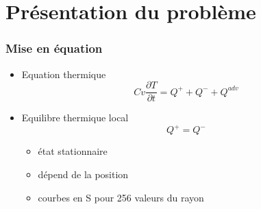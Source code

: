 \documentclass[french]{beamer}
\begin{document}




\section{Présentation du problème}
\begin{frame}
\frametitle{Mise en équation}

   \begin{itemize}
      \item Equation thermique
      \begin{equation}
         Cv\frac{\partial T}{\partial t} = Q^+ + Q^- +Q^{adv}
      \end{equation}
      
   \item Equilibre thermique local
   \begin{equation}
      Q^+ = Q^- 
   \end{equation}
   
      \begin{itemize}
         \item état stationnaire
         \\
         \item dépend de la position
         \item courbes en S pour 256 valeurs du rayon
      \end{itemize}
\end{itemize}
\end{frame}

\end{document}
